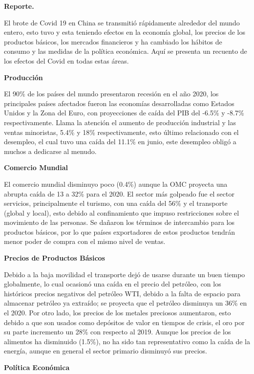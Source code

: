 \textbf{Reporte.}

El brote de Covid 19 en China se transmitió rápidamente alrededor del mundo entero, esto tuvo y esta teniendo efectos en la economía global, los precios de los productos básicos, los mercados financieros y ha cambiado los hábitos de consumo y las medidas de la política económica. Aquí se presenta un recuento de los efectos del Covid en todas estas áreas.

\textbf{Producción}

El 90\% de los países del mundo presentaron recesión en el año 2020, los principales países afectados fueron las economías desarrolladas como Estados Unidos y la Zona del Euro, con proyecciones de caída del PIB del -6.5\% y -8.7\% respectivamente.
Llama la atención el aumento de producción industrial y las ventas minoristas, 5.4\% y 18\% respectivamente, esto último relacionado con el desempleo, el cual tuvo una caída del 11.1\% en junio, este desempleo obligó a muchos a dedicarse al menudo.

\textbf{Comercio Mundial}

El comercio mundial disminuyo poco (0.4\%) aunque la OMC proyecta una abrupta caída de 13 a 32\% para el 2020.
El sector más golpeado fue el sector servicios, principalmente el turismo, con una caída del 56\% y el transporte (global y local), esto debido al confinamiento que impuso restricciones sobre el movimiento de las personas.
Se dañaron los términos de intercambio para los productos básicos, por lo que países exportadores de estos productos tendrán menor poder de compra con el mismo nivel de ventas.

\textbf{Precios de Productos Básicos}

Debido a la baja movilidad el transporte dejó de usarse durante un buen tiempo globalmente, lo cual ocasionó una caída en el precio del petróleo, con los históricos precios negativos del petróleo WTI, debido a la falta de espacio para almacenar petróleo ya extraído; se proyecta que el petróleo disminuya un 36\% en el 2020.
Por otro lado, los precios de los metales preciosos aumentaron, esto debido a que son usados como depósitos de valor en tiempos de crisis, el oro por su parte incremento un 28\% con respecto al 2019.
Aunque los precios de los alimentos ha disminuido (1.5\%), no ha sido tan representativo como la caída de la energía, aunque en general el sector primario disminuyó sus precios.

\textbf{Política Económica}

